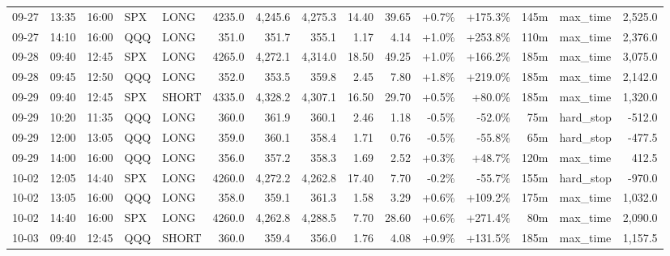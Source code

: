 \documentclass[11pt,a4paper,twoside]{article}
\begin{document}
\begin{landscape}
\begin{center}
\begin{longtable}{>{\color{txtmain}}l l l l l r r r r r r r r >{\color{txtmain}}l r}
09-27 & 13:35 & 16:00 & SPX & LONG & 4235.0 & 4,245.6 & 4,275.3 & 14.40 & 39.65 & \textcolor{wingreen}{+0.7\%} & \textcolor{wingreen}{+175.3\%} & 145m & max\_time & \textcolor{wingreen}{2,525.0} \\
09-27 & 14:10 & 16:00 & QQQ & LONG & 351.0 & 351.7 & 355.1 & 1.17 & 4.14 & \textcolor{wingreen}{+1.0\%} & \textcolor{wingreen}{+253.8\%} & 110m & max\_time & \textcolor{wingreen}{2,376.0} \\
09-28 & 09:40 & 12:45 & SPX & LONG & 4265.0 & 4,272.1 & 4,314.0 & 18.50 & 49.25 & \textcolor{wingreen}{+1.0\%} & \textcolor{wingreen}{+166.2\%} & 185m & max\_time & \textcolor{wingreen}{3,075.0} \\
09-28 & 09:45 & 12:50 & QQQ & LONG & 352.0 & 353.5 & 359.8 & 2.45 & 7.80 & \textcolor{wingreen}{+1.8\%} & \textcolor{wingreen}{+219.0\%} & 185m & max\_time & \textcolor{wingreen}{2,142.0} \\
09-29 & 09:40 & 12:45 & SPX & SHORT & 4335.0 & 4,328.2 & 4,307.1 & 16.50 & 29.70 & \textcolor{wingreen}{+0.5\%} & \textcolor{wingreen}{+80.0\%} & 185m & max\_time & \textcolor{wingreen}{1,320.0} \\
09-29 & 10:20 & 11:35 & QQQ & LONG & 360.0 & 361.9 & 360.1 & 2.46 & 1.18 & \textcolor{lossred}{-0.5\%} & \textcolor{lossred}{-52.0\%} & 75m & hard\_stop & \textcolor{lossred}{-512.0} \\
09-29 & 12:00 & 13:05 & QQQ & LONG & 359.0 & 360.1 & 358.4 & 1.71 & 0.76 & \textcolor{lossred}{-0.5\%} & \textcolor{lossred}{-55.8\%} & 65m & hard\_stop & \textcolor{lossred}{-477.5} \\
09-29 & 14:00 & 16:00 & QQQ & LONG & 356.0 & 357.2 & 358.3 & 1.69 & 2.52 & \textcolor{wingreen}{+0.3\%} & \textcolor{wingreen}{+48.7\%} & 120m & max\_time & \textcolor{wingreen}{412.5} \\
10-02 & 12:05 & 14:40 & SPX & LONG & 4260.0 & 4,272.2 & 4,262.8 & 17.40 & 7.70 & \textcolor{lossred}{-0.2\%} & \textcolor{lossred}{-55.7\%} & 155m & hard\_stop & \textcolor{lossred}{-970.0} \\
10-02 & 13:05 & 16:00 & QQQ & LONG & 358.0 & 359.1 & 361.3 & 1.58 & 3.29 & \textcolor{wingreen}{+0.6\%} & \textcolor{wingreen}{+109.2\%} & 175m & max\_time & \textcolor{wingreen}{1,032.0} \\
10-02 & 14:40 & 16:00 & SPX & LONG & 4260.0 & 4,262.8 & 4,288.5 & 7.70 & 28.60 & \textcolor{wingreen}{+0.6\%} & \textcolor{wingreen}{+271.4\%} & 80m & max\_time & \textcolor{wingreen}{2,090.0} \\
10-03 & 09:40 & 12:45 & QQQ & SHORT & 360.0 & 359.4 & 356.0 & 1.76 & 4.08 & \textcolor{wingreen}{+0.9\%} & \textcolor{wingreen}{+131.5\%} & 185m & max\_time & \textcolor{wingreen}{1,157.5} \\

\end{longtable}
\end{center}
\end{landscape}
\end{document}
